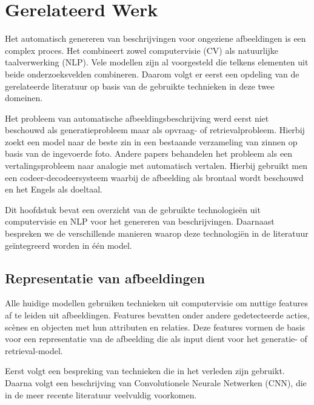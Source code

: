 \chapter{Gerelateerd Werk}
\label{hoofdstuk:related}
Het automatisch genereren van beschrijvingen voor ongeziene afbeeldingen is een complex proces. Het combineert zowel computervisie (CV) als natuurlijke taalverwerking (NLP). Vele modellen zijn al voorgesteld die telkens elementen uit beide onderzoeksvelden combineren. Daarom volgt er eerst een opdeling van de gerelateerde literatuur op basis van de gebruikte technieken in deze twee domeinen. 

Het probleem van automatische afbeeldingsbeschrijving werd eerst niet beschouwd als generatieprobleem maar als opvraag- of retrievalprobleem. Hierbij zoekt een model naar de beste zin in een bestaande verzameling van zinnen op basis van de ingevoerde foto.\cite{Hodosh2013} Andere papers behandelen het probleem als een vertalingsprobleem naar analogie met automatisch vertalen. Hierbij gebruikt men een codeer-decodeersysteem waarbij de afbeelding als brontaal wordt beschouwd en het Engels als doeltaal.

Dit hoofdstuk bevat een overzicht van de gebruikte technologie\"en uit computervisie en NLP voor het genereren van beschrijvingen. Daarnaast bespreken we de verschillende manieren waarop deze technologi\"en in de literatuur ge\"integreerd worden in \'e\'en model.

\section{Representatie van afbeeldingen}
Alle huidige modellen gebruiken technieken uit computervisie om nuttige features af te leiden uit afbeeldingen. Features bevatten onder andere gedetecteerde acties, sc\`enes en objecten met hun attributen en relaties.\cite{Bernardi} Deze features vormen de basis voor een representatie van de afbeelding die als input dient voor het generatie- of retrieval-model.

Eerst volgt een bespreking van technieken die in het verleden zijn gebruikt. Daarna volgt een beschrijving van Convolutionele Neurale Netwerken (CNN), die in de meer recente literatuur veelvuldig voorkomen.


